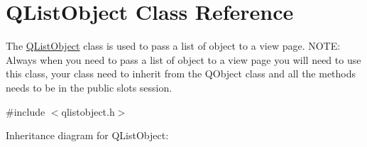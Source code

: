\hypertarget{class_q_list_object}{}\section{Q\+List\+Object Class Reference}
\label{class_q_list_object}


The \hyperlink{class_q_list_object}{Q\+List\+Object} class is used to pass a list of object to a view page. N\+O\+TE\+: Always when you need to pass a list of object to a view page you will need to use this class, your class need to inherit from the Q\+Object class and all the methods needs to be in the public slots session.  




{\ttfamily \#include $<$qlistobject.\+h$>$}



Inheritance diagram for Q\+List\+Object\+:
